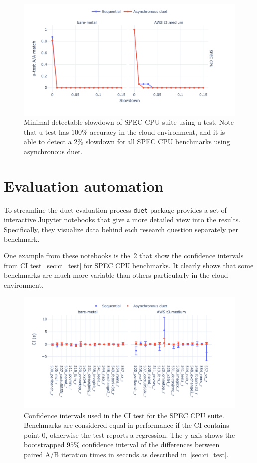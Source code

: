 \begin{figure}
	\centering
	\includegraphics[width=1\linewidth]{./figures/mds_utest.pdf}
	\caption{
		Minimal detectable slowdown of SPEC CPU suite using \mbox{u-test}.
		Note that \mbox{u-test} has $100\%$ accuracy in the cloud environment, and it is able to detect a $2\%$ slowdown for all SPEC CPU benchmarks using asynchronous duet.
	}
	\label{fig:mds_utest}
\end{figure}

\section{Evaluation automation}
\label{sec:automation}

To streamline the duet evaluation process \lstinline{duet} package provides a set of interactive Jupyter notebooks that give a more detailed view into the results.
Specifically, they visualize data behind each research question separately per benchmark.

One example from these notebooks is the~\cref{fig:ci_example} that show the confidence intervals from CI test~\cref{sec:ci_test} for SPEC CPU benchmarks.
It clearly shows that some benchmarks are much more variable than others particularly in the cloud environment.

\begin{figure}
	\centering
	\includegraphics[width=1\linewidth]{./figures/ci_example_benchmark.pdf}
	\caption{
		Confidence intervals used in the CI test for the SPEC CPU suite.
		Benchmarks are considered equal in performance if the CI contains point $0$, otherwise the test reports a regression.
		The \mbox{y-axis} shows the bootstrapped $95\%$ confidence interval of the differences between paired A/B iteration times in seconds as described in~\cref{sec:ci_test}.
	}
	\label{fig:ci_example}
\end{figure}
